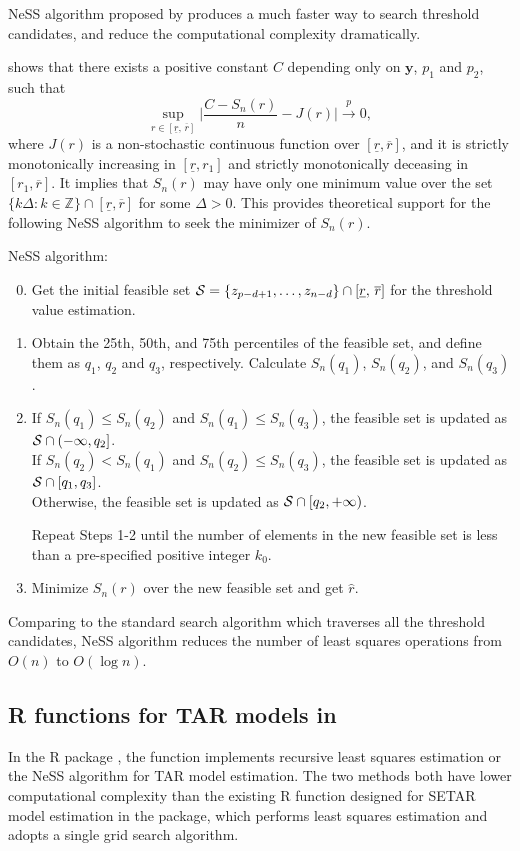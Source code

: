  NeSS algorithm proposed by \cite{li2016} produces a much faster way to search threshold candidates, and reduce the computational complexity dramatically.

\cite{li2016} shows that there exists a positive constant $C$ depending only on ${\mathbf y}$, $p_1$ and $p_2$, such that
\[
\sup_{r \in [ \underline{r}, \, \overline{r}]} \Big | \frac{C-S_n(r)}{n}-J(r) \Big| \overset{p}{\to} 0,
\]
where $J(r)$ is a non-stochastic continuous function over $[\underline{r}, \overline{r}]$, and it is strictly monotonically increasing in $[\underline{r}, r_1]$ and strictly monotonically deceasing in $[r_1, \overline{r}]$. It implies that $S_n(r)$ may have only one minimum value over the set $\{k\Delta: k\in {\mathbb{Z}}\} \cap [\underline{r}, \overline{r}]$ for some $\Delta>0$. This provides theoretical support for the following NeSS algorithm to seek the minimizer of $S_n(r)$.

NeSS algorithm:
\begin{enumerate}
\setcounter{enumi}{-1}
\item Get the initial feasible set ${\cal S}=\{{z}_{p-d+1},\ldots,{z}_{n-d}\}\cap [\underline{r},\, \overline{r}]$ for the threshold value estimation.

\item Obtain the 25th, 50th, and 75th percentiles of the feasible set, and define them as $q_1$, $q_2$ and $q_3$, respectively. Calculate $S_n(q_1)$, $S_n(q_2)$, and $S_n(q_3)$. 
\item If $S_n(q_1)\leq S_n(q_2)$ and $S_n(q_1)\leq S_n(q_3)$, the feasible set is updated as ${\cal S} \cap (-\infty,q_2]$.\\ If $S_n(q_2)< S_n(q_1)$ and $S_n(q_2)\leq S_n(q_3)$, the feasible set is updated as ${\cal S} \cap [q_1,q_3]$. \\
Otherwise, the feasible set is updated as ${\cal S} \cap [q_2, +\infty)$.  

Repeat Steps 1-2 until the number of elements in the new feasible set is less than a pre-specified positive integer $k_0$.
\item Minimize $S_n(r)$ over the new feasible set and get $\hat{r}$.
\end{enumerate}

Comparing to the standard search algorithm which traverses all the threshold candidates, NeSS algorithm reduces the number of least squares operations from $O(n)$ to $O(\log n)$.

\subsection{R functions for TAR models in }
In the R package , the function  implements recursive least squares estimation or the NeSS algorithm for TAR model estimation. The two methods both have lower computational complexity than the existing {R} function  designed for SETAR model estimation in
the {} package, which performs least squares estimation
and adopts a single grid search algorithm. 


